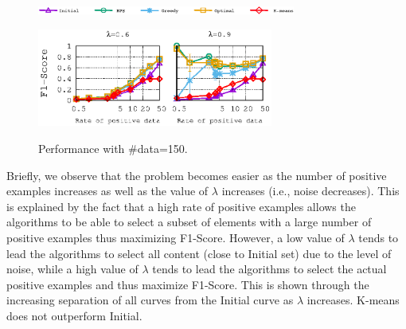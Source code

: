 \begin{figure}[H]
\begin{centering}
\includegraphics[width=8.5cm]{imgs/legend1}
\par\end{centering}
\begin{centering}
{\includegraphics[width=7.75cm]{imgs/Twitter_results/f1_performance_Data_150}}
\par\end{centering}
\caption{Performance with \#data=150.}
\label{fig:F1_vs_Pos_Twitter}
\end{figure}


Briefly, we observe that the problem becomes easier as the number of positive examples increases as well as the value of $\lambda$ increases (i.e., noise decreases). 
This is explained by the fact that a high rate of positive examples allows the algorithms to be able to select a subset of elements with a large number of positive examples thus maximizing F1-Score. However, a low value of $\lambda$ tends to lead the algorithms to select all content (close to Initial set) due to the level of noise, while a high value of $\lambda$ tends to lead the algorithms to select the actual positive examples and thus maximize F1-Score. This is shown through the increasing separation of all curves from the Initial curve as $\lambda$ increases.  K-means does not outperform Initial.









